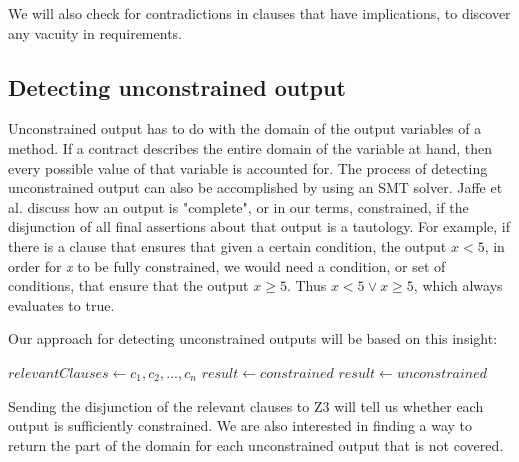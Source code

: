 \documentclass{article}
\newif\ifcomments
\newcommand{\egm}[1]{\ifcomments\textcolor{orange}{egm: #1}\fi}
\newcommand{\cass}[1]{\ifcomments\textcolor{blue}{cass: #1}\fi}
\begin{document}
We will also check for contradictions in clauses that have implications, to discover any vacuity in requirements.

\subsection*{Detecting unconstrained output}

Unconstrained output has to do with the domain of the output variables of a method. If a contract describes the entire
domain of the variable at hand, then every possible value of that variable is accounted for. The process of detecting
unconstrained output can also be accomplished by using an SMT solver. Jaffe et al. \cite{jaffe1989completeness} discuss how
an output is "complete", or in our terms, constrained, if the disjunction of all final assertions about that output is a
tautology. For example, if there is a clause that ensures that given a certain condition, the output \(x < 5\), in order
for {\it x} to be fully constrained, we would need a condition, or set of conditions, that ensure that the output \(x \geq 5\).
Thus \(x < 5 \lor x \geq 5\), which always evaluates to true.

Our approach for detecting unconstrained outputs will be based on this insight:
\break

\begin{algorithmic}

    \State $relevantClauses \gets c_{1}, c_{2}, ..., c_{n}$ 
        \State $result \gets constrained$
    \Else
        \State $result \gets unconstrained$
    \EndIf
\EndFor

\end{algorithmic}

Sending the disjunction of the relevant clauses to Z3 will tell us whether each output is sufficiently constrained.
We are also interested in finding a way to return the part of the domain for each unconstrained output that
is not covered. 
\egm{OK. Interesting. So if the ensures form a tautalogy then the output is constrained under every input? How do the pre-conditions factor in? It would have to be a tautology under the pre-condition constraints. Right? How is that logically stated?}
\cass{I still need to figure out how to check that the outputs form a tautology under the precondition constraints and state that logically, and my brain is too tired to figure it out right now :-)}
\end{document}
